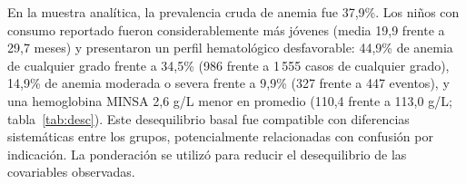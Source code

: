 \documentclass[man,11pt,donotrepeattitle,floatsintext]{apa7}
\begin{document}
En la muestra analítica, la prevalencia cruda de anemia fue 37{,}9\%. Los niños con consumo reportado fueron considerablemente más jóvenes (media 19{,}9 frente a 29{,}7 meses) y presentaron un perfil hematológico desfavorable: 44{,}9\% de anemia de cualquier grado frente a 34{,}5\% (986 frente a 1\,555 casos de cualquier grado), 14{,}9\% de anemia moderada o severa frente a 9{,}9\% (327 frente a 447 eventos), y una hemoglobina MINSA 2{,}6 g/L menor en promedio (110{,}4 frente a 113{,}0 g/L; tabla~\ref{tab:desc}). Este desequilibrio basal fue compatible con diferencias sistemáticas entre los grupos, potencialmente relacionadas con confusión por indicación. La ponderación se utilizó para reducir el desequilibrio de las covariables observadas.

\begin{table}[htbp]
	\centering
	\caption{Características según consumo reportado y balance posponderación}
	\label{tab:desc}
	\begingroup
	\renewcommand{\arraystretch}{1.15}
	\setlength{\tabcolsep}{6.9pt}
	\setlength{\heavyrulewidth}{0.75pt}
	\setlength{\lightrulewidth}{0.5pt}
\end{table}
\end{document}
